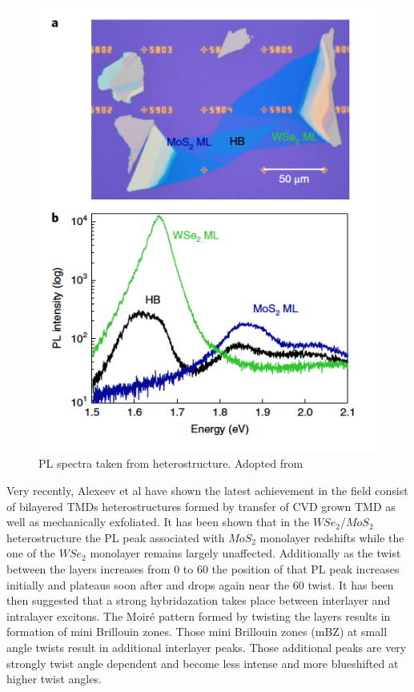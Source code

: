 \begin{figure}[h]
	\begin{center}
		\includegraphics[scale=1]{Heterostructures/HeterostructurePLSpectrumInterlayerIntro.png}
		\caption{PL spectra taken from heterostructure. Adopted from \cite{Kunstmann2018}}
		\label{fig:HeterostructurePLSpectrumInterlayerIntro}
	\end{center}
\end{figure}

Very recently, Alexeev et al \cite{Alexeev2019} have shown the latest achievement in the field consist of bilayered TMDs heterostructures formed by transfer of CVD grown TMD as well as mechanically exfoliated. It has been shown that in the $WSe_2$/$MoS_2$ heterostructure the PL peak associated with $MoS_2$ monolayer redshifts while the one of the $WSe_2$ monolayer remains largely unaffected. Additionally as the twist between the layers increases from 0{\degree} to 60{\degree} the position of that PL peak increases initially and plateaus soon after and drops again near the 60{\degree} twist. It has been then suggested that a strong hybridazation takes place between interlayer and intralayer excitons. The Moir\'{e} pattern formed by twisting the layers results in formation of mini Brillouin zones. Those mini Brillouin zones (mBZ) at small angle twists result in additional interlayer peaks.  Those additional peaks are very strongly twist angle dependent and become less intense and more blueshifted at higher twist angles. 

